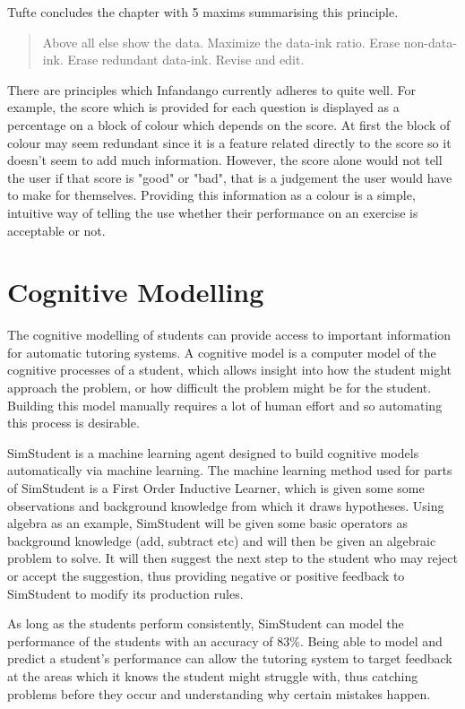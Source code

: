 Tufte concludes the chapter with 5 maxims summarising this principle.

\begin{verse}
	Above all else show the data.
	Maximize the data-ink ratio.
	Erase non-data-ink.
	Erase redundant data-ink.
	Revise and edit.
\end{verse}

There are principles which Infandango currently adheres to quite well. For example, the score which is provided for each question is displayed as a percentage on a block of colour which depends on the score. At first the block of colour may seem redundant since it is a feature related directly to the score so it doesn't seem to add much information. However, the score alone would not tell the user if that score is "good" or "bad", that is a judgement the user would have to make for themselves. Providing this information as a colour is a simple, intuitive way of telling the use whether their performance on an exercise is acceptable or not.

\section{Cognitive Modelling}
The cognitive modelling of students can provide access to important information for automatic tutoring systems. A cognitive model is a computer model of the cognitive processes of a student, which allows insight into how the student might approach the problem, or how difficult the problem might be for the student. Building this model manually requires a lot of human effort\cite{simstudent_better} and so automating this process is desirable.

SimStudent is a machine learning agent designed to build cognitive models automatically via machine learning. The machine learning method used for parts of SimStudent is a First Order Inductive Learner, which is given some some observations and background knowledge from which it draws hypotheses. Using algebra as an example, SimStudent will be given some basic operators as background knowledge (add, subtract etc) and will then be given an algebraic problem to solve. It will then suggest the next step to the student who may reject or accept the suggestion, thus providing negative or positive feedback to SimStudent to modify its production rules.

As long as the students perform consistently, SimStudent can model the performance of the students with an accuracy of 83\%\cite{simstudent}. Being able to model and predict a student's performance can allow the tutoring system to target feedback at the areas which it knows the student might struggle with, thus catching problems before they occur and understanding why certain mistakes happen.

